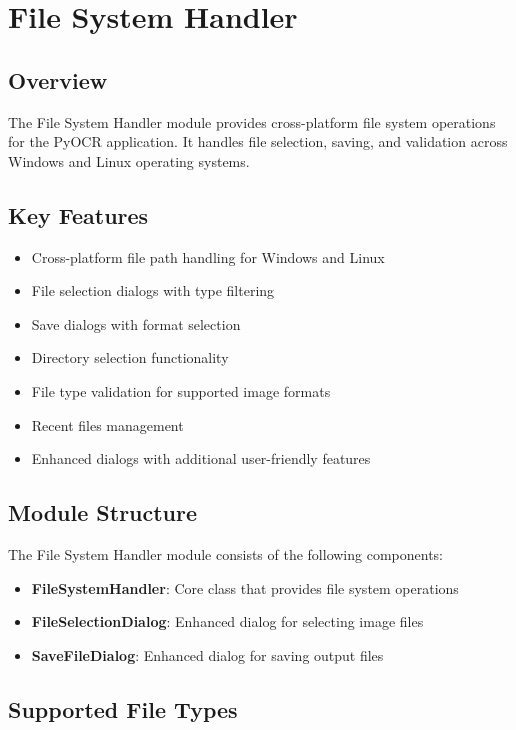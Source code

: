 \section{File System Handler}

\subsection{Overview}

The File System Handler module provides cross-platform file system operations for the PyOCR application. It handles file selection, saving, and validation across Windows and Linux operating systems.

\subsection{Key Features}

\begin{itemize}
    \item Cross-platform file path handling for Windows and Linux
    \item File selection dialogs with type filtering
    \item Save dialogs with format selection
    \item Directory selection functionality
    \item File type validation for supported image formats
    \item Recent files management
    \item Enhanced dialogs with additional user-friendly features
\end{itemize}

\subsection{Module Structure}

The File System Handler module consists of the following components:

\begin{itemize}
    \item \textbf{FileSystemHandler}: Core class that provides file system operations
    \item \textbf{FileSelectionDialog}: Enhanced dialog for selecting image files
    \item \textbf{SaveFileDialog}: Enhanced dialog for saving output files
\end{itemize}

\subsection{Supported File Types}

